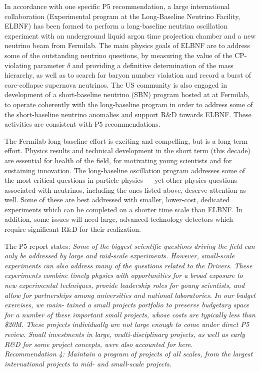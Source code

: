 In accordance with one specific P5 recommendation, a large international
collaboration (Experimental program at the Long-Baseline Neutrino
Facility, ELBNF) has been formed to perform a long-baseline neutrino
oscillation experiment with an underground liquid argon time
projection chamber and a new neutrino beam from
Fermilab.  The main physics goals of ELBNF are to address some of the
outstanding neutrino questions, by measuring the value of
the CP-violating parameter $\delta$ and providing a definitive
determination of the mass hierarchy, as well as to search for baryon
number violation and record a burst of core-collapse supernova
neutrinos.  The US community is also engaged in development of a
short-baseline neutrino (SBN) program hosted at at Fermilab, to operate
coherently with the long-baseline program in order to address some of the 
short-baseline neutrino anomalies and support R\&D towards ELBNF. 
These activities are consistent with P5 recommendations.

The Fermilab long-baseline effort is exciting and compelling, but
is a long-term effort.  Physics results and technical development in
the short term (this decade) are essential for health of the field,
for motivating young scientists and for sustaining innovation.  The
long-baseline oscillation program addresses some of the most critical
questions in particle physics --- yet other physics questions
associated with neutrinos, including the ones listed above, deserve
attention as well.  Some of these are best addressed with smaller,
lower-cost, dedicated experiments which can be completed
on a shorter time scale than ELBNF.  In addition, some issues will
need large, advanced-technology detectors which require
significant R\&D for their realization.

The P5 report states:
\textit{Some of the biggest scientific questions driving the field can only be
addressed by large and mid-scale experiments. However, small-scale
experiments can also address many of the questions related to the
Drivers. These experiments combine timely physics with opportunities
for a broad exposure to new experimental techniques, provide
leadership roles for young scientists, and allow for partnerships
among universities and national laboratories. In our budget exercises,
we main- tained a small projects portfolio to preserve budgetary space
for a number of these important small projects, whose costs are
typically less than \$20M. These projects individually are not large
enough to come under direct P5 review. Small investments in large,
multi-disciplinary projects, as well as early R\&D for some project
concepts, were also accounted for here.}\\
\textit{{Recommendation 4: Maintain a program of projects of all
  scales, from the largest international projects to mid- and
  small-scale projects.}}


